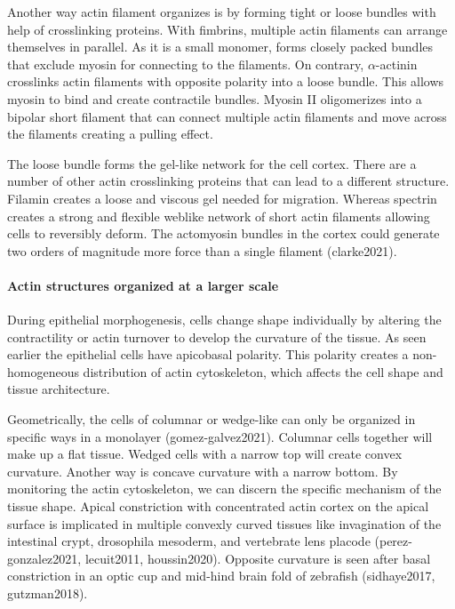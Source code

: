 \documentclass[
]{article}
\begin{document}
Another way actin filament organizes is by forming tight or loose
bundles with help of crosslinking proteins. With fimbrins, multiple
actin filaments can arrange themselves in parallel. As it is a small
monomer, forms closely packed bundles that exclude myosin for connecting
to the filaments. On contrary, $\alpha$-actinin crosslinks actin filaments with
opposite polarity into a loose bundle. This allows myosin to bind and
create contractile bundles. Myosin II oligomerizes into a bipolar short
filament that can connect multiple actin filaments and move across the
filaments creating a pulling effect.

The loose bundle forms the gel-like network for the cell cortex. There
are a number of other actin crosslinking proteins that can lead to a
different structure. Filamin creates a loose and viscous gel needed for
migration. Whereas spectrin creates a strong and flexible weblike
network of short actin filaments allowing cells to reversibly deform.
The actomyosin bundles in the cortex could generate two orders of
magnitude more force than a single filament (clarke2021).

\hypertarget{actin-structures-organized-at-a-larger-scale}{%
\paragraph{Actin structures organized at a larger
scale}\label{actin-structures-organized-at-a-larger-scale}}

During epithelial morphogenesis, cells change shape individually by
altering the contractility or actin turnover to develop the curvature of
the tissue. As seen earlier the epithelial cells have apicobasal
polarity. This polarity creates a non-homogeneous distribution of actin
cytoskeleton, which affects the cell shape and tissue architecture.

Geometrically, the cells of columnar or wedge-like can only be organized
in specific ways in a monolayer (gomez-galvez2021). Columnar cells
together will make up a flat tissue. Wedged cells with a narrow top will
create convex curvature. Another way is concave curvature with a narrow
bottom. By monitoring the actin cytoskeleton, we can discern the
specific mechanism of the tissue shape. Apical constriction with
concentrated actin cortex on the apical surface is implicated in
multiple convexly curved tissues like invagination of the intestinal
crypt, drosophila mesoderm, and vertebrate lens placode
(perez-gonzalez2021, lecuit2011, houssin2020). Opposite curvature is
seen after basal constriction in an optic cup and mid-hind brain fold of
zebrafish (sidhaye2017, gutzman2018).
\end{document}
